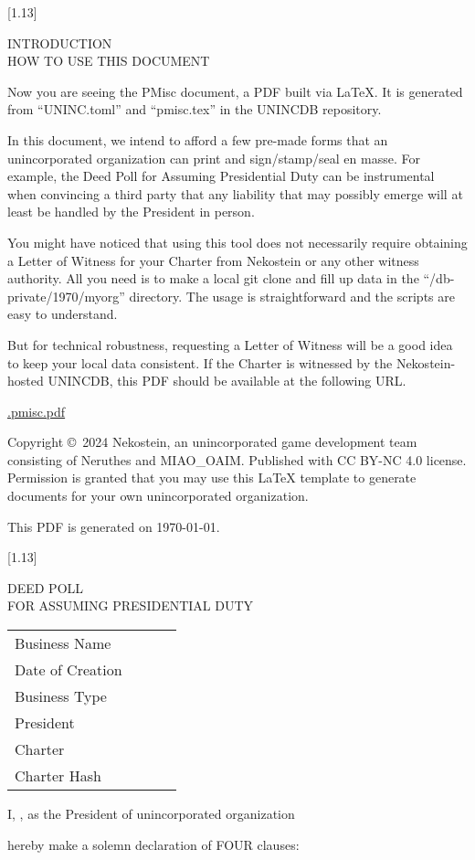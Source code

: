 \documentclass[10pt,a4paper,hidelinks]{article}
\newcommand{\newdochere}[1]{
    \setcounter{page}{1}
    \setcounter{section}{0}
    \scalebox{1}[1.13]{%
        \parbox{\textwidth}{%
            \begin{center}%
                \large\rmfamily\mdseries\strut%
                #1%
            \end{center}%
        }%
    }%
    \par
}
\newcommand{\stdorginfo}[0]{
    \parbox{\linewidth}{
        \tabcolsep=0pt
        \begin{tabu}{lX}
            \toprule
            \mdseries Business Name~~~~~~ & \fulltomldataATfullname \\
            \mdseries Date of Creation & \fulltomldataATdatecreation \\
            \mdseries Business Type & \fulltomldataATtype \\
            \mdseries President & \fulltomldataATpresident \\
            \mdseries Charter & \uninctomldataATwitnessFIRST \\
            \mdseries Charter Hash & \fulltomldataATcharterhash \\
            \bottomrule
        \end{tabu}
    }\par\vskip 14pt
}
\begin{document}
\newdochere{INTRODUCTION\\HOW TO USE THIS DOCUMENT}
\thispagestyle{empty}

Now you are seeing the PMisc document, a PDF built via \LaTeX.
It is generated from ``UNINC.toml'' and ``pmisc.tex'' in the UNINCDB repository.

In this document, we intend to afford a few pre-made forms
that an unincorporated organization can print and sign/stamp/seal en masse.
For example, the Deed Poll for Assuming Presidential Duty can be instrumental
when convincing a third party that any liability that may possibly emerge
will at least be handled by the President in person.

You might have noticed that using this tool does not necessarily require obtaining a Letter of Witness
for your Charter from Nekostein or any other witness authority.
All you need is to make a local git clone and fill up data in the ``/db-private/1970/myorg'' directory.
The usage is straightforward and the scripts are easy to understand.

But for technical robustness, requesting a Letter of Witness will be a good idea to keep your local data consistent.
If the Charter is witnessed by the Nekostein-hosted UNINCDB,
this PDF should be available at the following URL.

\begin{center}
    \href{\unincdbaltdocprefix.pmisc.pdf}{\unincdbaltdocprefix.pmisc.pdf}
\end{center}

\vfill
\begingroup\small
Copyright \copyright~2024 Nekostein, an unincorporated game development team consisting of Neruthes and MIAO\_OAIM.
Published with CC BY-NC 4.0 license.
Permission is granted that you may use this \LaTeX{} template to generate documents for your own unincorporated organization.

This PDF is generated on \today.
\endgroup





\clearpage
\newdochere{DEED POLL\\FOR ASSUMING PRESIDENTIAL DUTY}
\thispagestyle{empty}

\stdorginfo

\strut I,
\underline{\fulltomldataATpresident},
as the President of unincorporated organization

\underline{\fulltomldataATfullname}

hereby make a solemn declaration of FOUR clauses:
\end{document}
